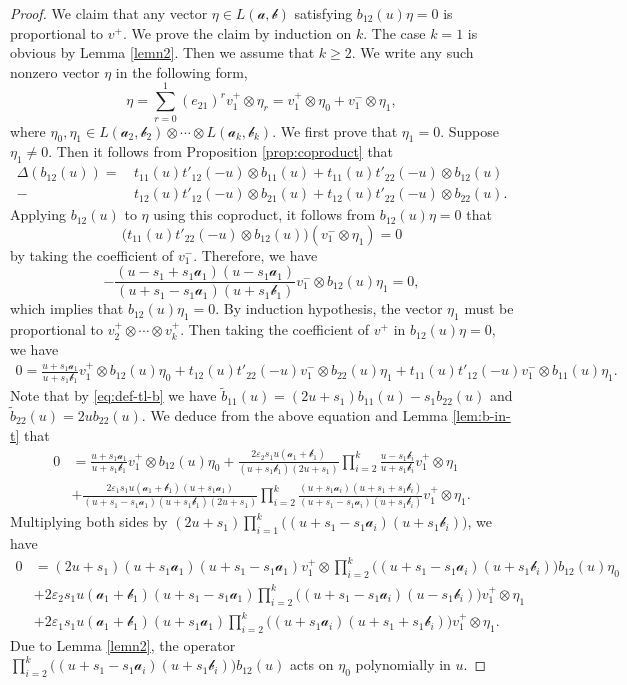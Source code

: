 \documentclass[11pt,reqno]{amsart}
\numberwithin{equation}{section}
\theoremstyle{definition}
\theoremstyle{remark}
\newcommand{\mc}{\mathcal}
\newcommand{\tl}{\tilde}
\newcommand{\gge}{\geqslant}
\newcommand{\ve}{\varepsilon}
\begin{document}
\begin{proof}
We claim that any vector $\eta\in L(\bm{\mc a,\mc b})$ satisfying $b_{12}(u)\eta=0$ is proportional to $v^+$. We prove the claim by induction on $k$. The case $k=1$ is obvious by Lemma \ref{lemn2}. Then we assume that $k\gge 2$. We write any such nonzero vector $\eta$ in the following form,
\[
\eta=\sum_{r=0}^1 (e_{21})^rv_1^+\otimes\eta_r=v_1^+\otimes \eta_0+v_1^-\otimes \eta_1,
\]
where $\eta_0,\eta_1\in L(\mc a_2,\mc b_2)\otimes \cdots\otimes L(\mc a_k,\mc b_k)$. We first prove that $\eta_1=0$. Suppose $\eta_1\ne 0$. Then it follows from Proposition \ref{prop:coproduct} that
\begin{align*}
    \Delta(b_{12}(u))=&\, t_{11}(u)t'_{12}(-u)\otimes b_{11}(u)+t_{11}(u)t'_{22}(-u)\otimes b_{12}(u)\\-&\,
    t_{12}(u)t'_{12}(-u)\otimes b_{21}(u)+t_{12}(u)t'_{22}(-u)\otimes b_{22}(u).
\end{align*}
Applying $b_{12}(u)$ to $\eta$ using this coproduct, it follows from $b_{12}(u)\eta=0$ that
\[
\big(t_{11}(u)t'_{22}(-u)\otimes b_{12}(u)\big)(v_1^-\otimes \eta_1)=0
\]
by taking the coefficient of $v_1^-$. Therefore, we have
\[
-\frac{(u-s_1+s_1\mc a_1)(u-s_1\mc a_1)}{(u+s_1-s_1\mc a_1)(u+s_1\mc b_1)}v_1^-\otimes b_{12}(u)\eta_1=0,
\]
which implies that $b_{12}(u)\eta_1=0$. By induction hypothesis, the vector $\eta_1$ must be proportional to $v_2^+\otimes\cdots\otimes v_k^+$. Then taking the coefficient of $v^+$ in $b_{12}(u)\eta=0$, we have
\begin{align*}
0=\frac{u+s_1\mc a_1}{u+s_1\mc b_1}v_1^+\otimes b_{12}(u)\eta_0+t_{12}(u)t'_{22}(-u)v_1^-\otimes b_{22}(u)\eta_1+t_{11}(u)t'_{12}(-u)v_1^-\otimes b_{11}(u)\eta_1.
\end{align*}
Note that by \eqref{eq:def-tl-b} we have $\tl b_{11}(u)=(2u+s_1)b_{11}(u)-s_1b_{22}(u)$ and $\tl b_{22}(u)=2ub_{22}(u)$. We deduce from the above equation and Lemma \ref{lem:b-in-t} that
\begin{align*}
0&=\frac{u+s_1\mc a_1}{u+s_1\mc b_1}v_1^+\otimes b_{12}(u)\eta_0+\frac{2\ve_2s_1u(\mc a_1+\mc b_1)}{(u+s_1\mc b_1)(2u+s_1)}\prod_{i=2}^k\frac{u-s_1\mc b_i}{u+s_1\mc b_i} v_1^+\otimes \eta_1 \\
&+\frac{2\ve_1s_1u(\mc a_1+\mc b_1)(u+s_1\mc a_1)}{(u+s_1-s_1\mc a_1)(u+s_1\mc b_1)(2u+s_1)}\prod_{i=2}^k\frac{(u+s_1\mc a_i)(u+s_1+s_1\mc b_i)}{(u+s_1-s_1\mc a_i)(u+s_1\mc b_i)} v_1^+\otimes \eta_1.
\end{align*}
Multiplying both sides by $(2u+s_1)\prod_{i=1}^k\big((u+s_1-s_1\mc a_i)(u+s_1\mc b_i)\big)$, we have
\begin{align*}
0&=(2u+s_1)(u+s_1\mc a_1)(u+s_1-s_1\mc a_1)v_1^+\otimes \prod_{i=2}^k\big((u+s_1-s_1\mc a_i)(u+s_1\mc b_i)\big)b_{12}(u)\eta_0\\
&+2\ve_2s_1u(\mc a_1+\mc b_1)(u+s_1-s_1\mc a_1)\prod_{i=2}^k\big((u+s_1-s_1\mc a_i)(u-s_1\mc b_i)\big) v_1^+\otimes \eta_1 \\
&+2\ve_1s_1u(\mc a_1+\mc b_1)(u+s_1\mc a_1)\prod_{i=2}^k\big((u+s_1\mc a_i)(u+s_1+s_1\mc b_i)\big) v_1^+\otimes \eta_1.
\end{align*}
Due to Lemma \ref{lemn2}, the operator $\prod_{i=2}^k\big((u+s_1-s_1\mc a_i)(u+s_1\mc b_i)\big)b_{12}(u)$ acts on $\eta_0$ polynomially in $u$.


\end{proof}
\end{document}
